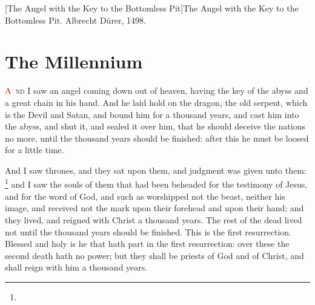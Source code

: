 [The Angel with the Key to the Bottomless Pit]{The Angel with the Key to the Bottomless Pit. Albrecht Dürer, 1498.}

\chapter{The Millennium}
\lettrine[lines=3,slope=0.5em]{\textcolor{red}{A}}{\ nd} I saw an angel coming down out of heaven, having the key of the abyss and a great chain in his hand. 
And he laid hold on the dragon, the old serpent, which is the Devil and Satan, and bound him for a thousand years, 
and cast him into the abyss, and shut it,%
and sealed it over him, that he should deceive the nations no more, until the thousand years should be finished: after this he must be loosed for a little time.

And I saw thrones, and they sat upon them, and judgment was given unto them:%
	\footnote{ %
			  } %
and I saw the souls of them that had been beheaded for the testimony of Jesus, and for the word of God, and such as worshipped not the beast, neither his image, and received not the mark upon their forehead and upon their hand; and they lived,%
and reigned with Christ a thousand years.%
The rest of the dead lived not until the thousand years should be finished. This is the first resurrection. 
Blessed and holy is he that hath part in the first resurrection: over these the second death hath no power; but they shall be priests of God and of Christ, and shall reign with him a thousand years.

